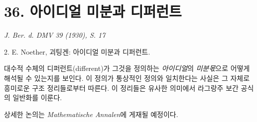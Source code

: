 
\section*{36. 아이디얼 미분과 디퍼런트}

\begin{center}
\emph{J. Ber. d. DMV 39 (1930), S. 17}
\end{center}

2. E. Noether, 괴팅겐: 아이디얼 미분과 디퍼런트.

대수적 수체의 디퍼런트(different)가 그것을 정의하는 \emph{아이디얼}의 \emph{미분몫}으로 어떻게 해석될 수 있는지를 보인다. 이 정의가 통상적인 정의와 일치한다는 사실은 그 자체로 흥미로운 구조 정리들로부터 따른다. 이 정리들은 유사한 의미에서 라그랑주 보간 공식의 일반화를 이룬다.

상세한 논의는 \emph{Mathematische Annalen}에 게재될 예정이다.
